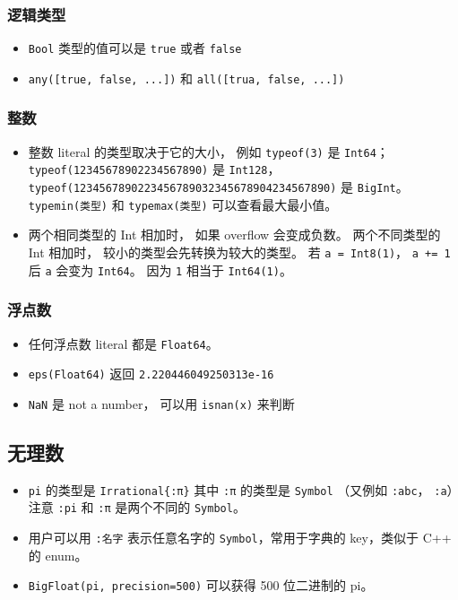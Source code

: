 \subsubsection{逻辑类型}
\begin{itemize}
\item \verb`Bool` 类型的值可以是 \verb`true` 或者 \verb`false`
\item \verb`any([true, false, ...])` 和 \verb`all([trua, false, ...])`
\end{itemize}

\subsubsection{整数}
\begin{itemize}
\item 整数 literal 的类型取决于它的大小， 例如 \verb`typeof(3)` 是 \verb`Int64`； \verb`typeof(12345678902234567890)` 是 \verb`Int128`， \verb`typeof(1234567890223456789032345678904234567890)` 是 \verb`BigInt`。 \verb`typemin(类型)` 和 \verb`typemax(类型)` 可以查看最大最小值。
\item 两个相同类型的 Int 相加时， 如果 overflow 会变成负数。 两个不同类型的 Int 相加时， 较小的类型会先转换为较大的类型。 若 \verb`a = Int8(1)`， \verb`a += 1` 后 \verb`a` 会变为 \verb`Int64`。 因为 \verb`1` 相当于 \verb`Int64(1)`。
\end{itemize}

\subsubsection{浮点数}
\begin{itemize}
\item 任何浮点数 literal 都是 \verb`Float64`。
\item \verb`eps(Float64)` 返回 \verb`2.220446049250313e-16`
\item \verb`NaN` 是 not a number， 可以用 \verb`isnan(x)` 来判断
\end{itemize}

\subsection{无理数}
\begin{itemize}
\item \verb`pi` 的类型是 \verb`Irrational{:π}` 其中 \verb`:π` 的类型是 \verb`Symbol` （又例如 \verb`:abc`， \verb`:a`）注意 \verb`:pi` 和 \verb`:π` 是两个不同的 \verb`Symbol`。
\item 用户可以用 \verb`:名字` 表示任意名字的 \verb`Symbol`，常用于字典的 key，类似于 C++ 的 enum。
\item \verb`BigFloat(pi, precision=500)` 可以获得 500 位二进制的 pi。
\end{itemize}


